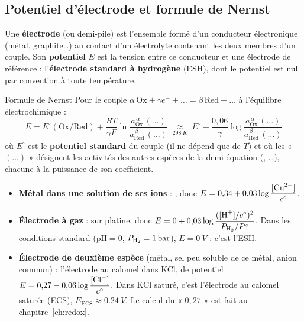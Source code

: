 \subsection{Potentiel d'électrode et formule de Nernst}

\begin{definition}
Une \textbf{électrode} (ou demi-pile) est l'ensemble formé d'un conducteur électronique (métal, graphite\dots) au contact d'un électrolyte contenant les deux membres d'un couple. Son \textbf{potentiel} $E$ est la tension entre ce conducteur et une électrode de référence : l'\textbf{électrode standard à hydrogène} (ESH), dont le potentiel est nul par convention à toute température.
\end{definition}

\begin{resultat}{Formule de Nernst}
Pour le couple $\alpha\,\mathrm{Ox} + \gamma e^- + \dots = \beta\,\mathrm{Red} + \dots$ à l'équilibre électrochimique :
\[ E = E^\circ(\mathrm{Ox/Red}) + \frac{RT}{\gamma F}\ln\frac{a_{\mathrm{Ox}}^{\,\alpha}\,(\dots)}{a_{\mathrm{Red}}^{\,\beta}\,(\dots)} \;\underset{\SI{298}{K}}{\approx}\; E^\circ + \frac{0{,}06}{\gamma}\log\frac{a_{\mathrm{Ox}}^{\,\alpha}\,(\dots)}{a_{\mathrm{Red}}^{\,\beta}\,(\dots)} \]
où $E^\circ$ est le \textbf{potentiel standard} du couple (il ne dépend que de $T$) et où les « $(\dots)$ » désignent les activités des autres espèces de la demi-équation (, \dots), chacune à la puissance de son coefficient.
\end{resultat}

\begin{exemple}
\begin{itemize}
  \item \textbf{Métal dans une solution de ses ions} : , donc $E = 0{,}34 + 0{,}03\log\dfrac{[\ce{Cu^{2+}}]}{c^\circ}$.
  \item \textbf{Électrode à gaz} :  sur platine, donc $E = 0 + 0{,}03\log\dfrac{([\ce{H+}]/c^\circ)^2}{P_{\ce{H2}}/P^\circ}$. Dans les conditions standard ($\mathrm{pH} = 0$, $P_{\ce{H2}} = \SI{1}{bar}$), $E = \SI{0}{V}$ : c'est l'ESH.
  \item \textbf{Électrode de deuxième espèce} (métal, sel peu soluble de ce métal, anion commun) : l'électrode au calomel  dans KCl, de potentiel $E = 0{,}27 - 0{,}06\log\dfrac{[\ce{Cl-}]}{c^\circ}$. Dans KCl saturé, c'est l'électrode au calomel saturée (ECS), $E_{\text{ECS}} \approx \SI{0,24}{V}$. Le calcul du « $0{,}27$ » est fait au chapitre~\ref{ch:redox}.
\end{itemize}
\end{exemple}


